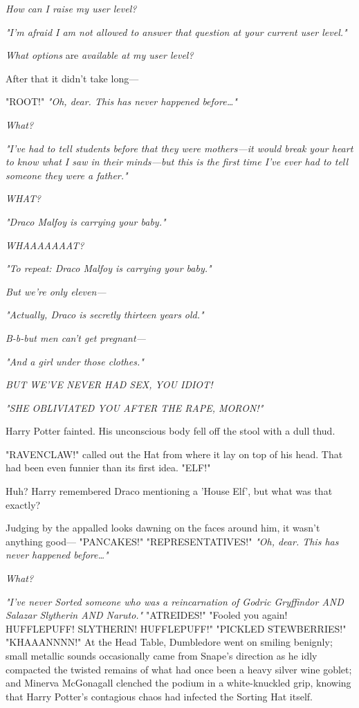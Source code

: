 \emph{How can I raise my user level?}

\emph{"I'm afraid I am not allowed to answer that question at your current user level."}

\emph{What options} are\emph{ available at my user level?}

After that it didn't take long---

"ROOT!"
\sbreak
\emph{"Oh, dear. This has never happened before{\ldots}"}

\emph{What?}

\emph{"I've had to tell students before that they were mothers---it would break your heart to know what I saw in their minds---but this is the first time I've ever had to tell someone they were a father."}

\emph{WHAT?}

\emph{"Draco Malfoy is carrying your baby."}

\emph{WHAAAAAAAT?}

\emph{"To repeat: Draco Malfoy is carrying your baby."}

\emph{But we're only eleven---}

\emph{"Actually, Draco is secretly thirteen years old."}

\emph{B-b-but men can't get pregnant---}

\emph{"And a girl under those clothes."}

\emph{BUT WE'VE NEVER HAD SEX, YOU IDIOT!}

\emph{"SHE OBLIVIATED YOU AFTER THE RAPE, MORON!"}

Harry Potter fainted. His unconscious body fell off the stool with a dull thud.

"RAVENCLAW!" called out the Hat from where it lay on top of his head. That had been even funnier than its first idea.
\sbreak
"ELF!"

Huh? Harry remembered Draco mentioning a 'House Elf', but what was that exactly?

Judging by the appalled looks dawning on the faces around him, it wasn't anything good---
\sbreak
"PANCAKES!"
\sbreak
"REPRESENTATIVES!"
\sbreak
\emph{"Oh, dear. This has never happened before{\ldots}"}

\emph{What?}

\emph{"I've never Sorted someone who was a reincarnation of Godric Gryffindor AND Salazar Slytherin AND Naruto."}
\sbreak
"ATREIDES!"
\sbreak
"Fooled you again! HUFFLEPUFF! SLYTHERIN! HUFFLEPUFF!"
\sbreak
"PICKLED STEWBERRIES!"
\sbreak
"KHAAANNNN!"
\sbreak
At the Head Table, Dumbledore went on smiling benignly; small metallic sounds occasionally came from Snape's direction as he idly compacted the twisted remains of what had once been a heavy silver wine goblet; and Minerva McGonagall clenched the podium in a white-knuckled grip, knowing that Harry Potter's contagious chaos had infected the Sorting Hat itself.

